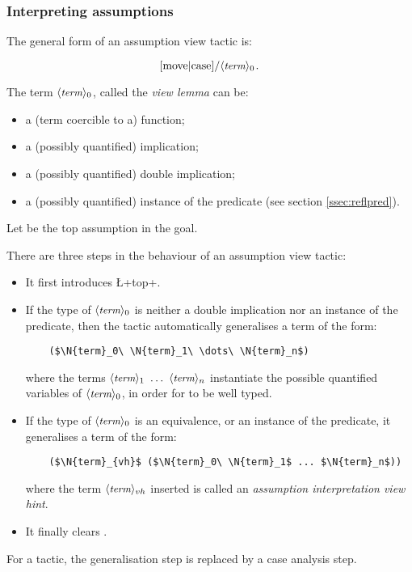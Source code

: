 \subsubsection*{Interpreting assumptions}
\label{sssec:hypview}
The general form of an assumption view tactic is:

$$[\C{move}|\C{case}]\C{/}\N{term}_0\C{.}$$

The term $\langle\mbox{\itshape\rmfamily\small term}\rangle_0$, called the \emph{view lemma} can be:
\begin{itemize}
\item a (term coercible to a) function;
\item a (possibly quantified) implication;
\item a (possibly quantified) double implication;
\item a (possibly quantified) instance of the  predicate
  (see section \ref{ssec:reflpred}).
\end{itemize}

Let  be the top assumption in the goal.

There are three steps in the behaviour of an assumption view tactic:
\begin{itemize}
\item It first introduces \L+top+.
\item If the type of $\langle\mbox{\itshape\rmfamily\small term}\rangle_0$ is neither a double implication nor
  an instance of the  predicate, then the tactic
  automatically generalises a term of the form:
  \begin{lstlisting}
    ($\N{term}_0\ \N{term}_1\ \dots\ \N{term}_n$)
  \end{lstlisting}
  where the terms $\N{term}_1\ \dots\ \N{term}_n$ instantiate the
  possible quantified variables of $\langle\mbox{\itshape\rmfamily\small term}\rangle_0$, in order for
   to be well typed.
\item If the type of $\langle\mbox{\itshape\rmfamily\small term}\rangle_0$ is an equivalence, or
  an instance of the  predicate, it generalises a term of
  the form:
  \begin{lstlisting}
    ($\N{term}_{vh}$ ($\N{term}_0\ \N{term}_1$ ... $\N{term}_n$))
  \end{lstlisting}
  where the term $\langle\mbox{\itshape\rmfamily\small term}\rangle_{vh}$ inserted is called an
  \emph{assumption interpretation view hint}.
\item It finally clears .
\end{itemize}
For a  tactic, the generalisation step is
replaced by a case analysis step.

